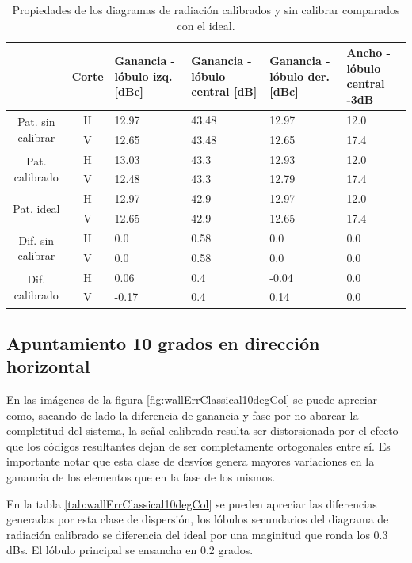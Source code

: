\begin{table}[H]
  \footnotesize
  \centering
  \begin{tabular}{|c|c|p{2cm}|p{2.5cm}|p{2.5cm}|p{2.5cm}|}
    \cline{2-6}
    \multicolumn{1}{c|}{} & Corte & Ganancia - lóbulo izq. [dBc] & Ganancia - lóbulo central [dB] &
    Ganancia - lóbulo der. [dBc] & Ancho - lóbulo central -3dB \tabularnewline\hline
    \multirow{2}{2cm}{Pat. sin calibrar} & H & 12.97 & 43.48 & 12.97 & 12.0 \tabularnewline\cline{2-6}
     & V & 12.65 & 43.48 & 12.65 & 17.4 \tabularnewline\hline
    \multirow{2}{2cm}{Pat. calibrado} & H & 13.03 & 43.3 & 12.93 & 12.0 \tabularnewline\cline{2-6}
     & V & 12.48 & 43.3 & 12.79 & 17.4 \tabularnewline\hline
    \multirow{2}{2cm}{Pat. ideal} & H & 12.97 & 42.9 & 12.97 & 12.0 \tabularnewline\cline{2-6}
     & V & 12.65 & 42.9 & 12.65 & 17.4 \tabularnewline\hline
    \multirow{2}{2cm}{Dif. sin calibrar} & H & 0.0 & 0.58 & 0.0 & 0.0\tabularnewline\cline{2-6}
     & V & 0.0 & 0.58 & 0.0 & 0.0 \tabularnewline\hline
    \multirow{2}{2cm}{Dif. calibrado} & H & 0.06 & 0.4 & -0.04 & 0.0 \tabularnewline\cline{2-6}
     & V & -0.17 & 0.4 & 0.14 & 0.0 \tabularnewline\hline
  \end{tabular}
  \caption{Propiedades de los diagramas de radiación calibrados y sin calibrar comparados con el ideal.}
  \label{tab:wallErrClassical0deg}
\end{table}


\subsection{Apuntamiento 10 grados en dirección horizontal}

En las imágenes de la figura \ref{fig:wallErrClassical10degCol} se puede apreciar como, sacando de lado la diferencia de ganancia 
y fase por no abarcar la completitud del sistema, la señal calibrada resulta ser distorsionada por el efecto que los códigos 
resultantes dejan de ser completamente ortogonales entre sí. Es importante notar que esta clase de desvíos genera mayores 
variaciones en la ganancia de los elementos que en la fase de los mismos.
 
En la tabla \ref{tab:wallErrClassical10degCol} se pueden apreciar las diferencias generadas por esta clase de dispersión, los 
lóbulos secundarios del diagrama de radiación calibrado se diferencia del ideal por una maginitud que ronda los 0.3 dBs. El 
lóbulo principal se ensancha en 0.2 grados.

